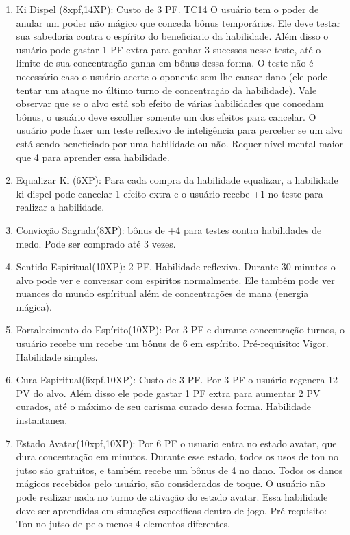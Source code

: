 \begin{enumerate}
  \item Ki Dispel (8xpf,14XP): Custo de 3 PF. TC14\newline
O usuário tem o poder de anular um poder não mágico que conceda bônus temporários. Ele deve testar sua sabedoria contra o espírito do beneficiario da habilidade. Além disso o usuário pode gastar 1 PF extra para ganhar 3 sucessos nesse teste, até o limite de sua concentração ganha em bônus dessa forma. O teste não é necessário caso o usuário acerte o oponente sem lhe causar dano (ele pode tentar um ataque no último turno de concentração da habilidade). Vale observar que se o alvo está sob efeito de várias habilidades que concedam bônus, o usuário deve escolher somente um dos efeitos para cancelar. O usuário pode fazer um teste reflexivo de inteligência para perceber se um alvo está sendo beneficiado por uma habilidade ou não. Requer nível mental maior que 4 para aprender essa habilidade.

		\item Equalizar Ki (6XP): Para cada compra da habilidade equalizar, a habilidade ki dispel pode cancelar 1 efeito extra e o usuário recebe +1 no teste para realizar a habilidade.

\item Convicção Sagrada(8XP): bônus de +4 para testes contra habilidades de medo. Pode ser comprado até 3 vezes.

\item Sentido Espiritual(10XP): 2 PF. Habilidade reflexiva.\newline
Durante 30 minutos o alvo pode ver e conversar com espiritos normalmente. Ele também pode ver nuances do mundo espíritual além de concentrações de mana (energia mágica). 

\item Fortalecimento do Espírito(10XP): Por 3 PF e durante concentração turnos, o usuário recebe um recebe um bônus de 6 em espírito. Pré-requisito: Vigor. Habilidade simples.

\item Cura Espiritual(6xpf,10XP): Custo de 3 PF.\newline
Por 3 PF o usuário regenera 12 PV do alvo. Além disso ele pode gastar 1 PF extra para aumentar 2 PV curados, até o máximo de seu carisma curado dessa forma. Habilidade instantanea.

\item Estado Avatar(10xpf,10XP): Por 6 PF o usuario entra no estado avatar, que dura concentração em minutos. Durante esse estado, todos os usos de ton no jutso são gratuitos, e também recebe um bônus de 4 no dano. Todos os danos mágicos recebidos pelo usuário, são considerados de toque. O usuário não pode realizar nada no turno de ativação do estado avatar. Essa habilidade deve ser aprendidas em situações específicas dentro de jogo. Pré-requisito: Ton no jutso de pelo menos 4 elementos diferentes.



\end{enumerate}
